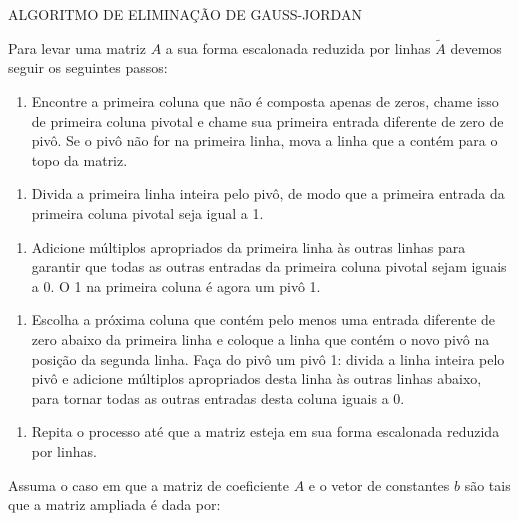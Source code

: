 \documentclass[
  brazilian,
  letterpaper,
  DIV=11,
  numbers=noendperiod]{scrreprt}
\providecommand{\tightlist}{%
  \setlength{\itemsep}{0pt}\setlength{\parskip}{0pt}}
\begin{document}
ALGORITMO DE ELIMINAÇÃO DE GAUSS-JORDAN

Para levar uma matriz \(A\) a sua forma escalonada reduzida por linhas
\(\tilde{A}\) devemos seguir os seguintes passos:

\begin{enumerate}
\def\labelenumi{\arabic{enumi}.}
\tightlist
\item
  Encontre a primeira coluna que não é composta apenas de zeros, chame
  isso de primeira coluna pivotal e chame sua primeira entrada diferente
  de zero de pivô. Se o pivô não for na primeira linha, mova a linha que
  a contém para o topo da matriz.
\end{enumerate}

\begin{enumerate}
\def\labelenumi{\arabic{enumi}.}
\setcounter{enumi}{1}
\tightlist
\item
  Divida a primeira linha inteira pelo pivô, de modo que a primeira
  entrada da primeira coluna pivotal seja igual a 1.
\end{enumerate}

\begin{enumerate}
\def\labelenumi{\arabic{enumi}.}
\setcounter{enumi}{2}
\tightlist
\item
  Adicione múltiplos apropriados da primeira linha às outras linhas para
  garantir que todas as outras entradas da primeira coluna pivotal sejam
  iguais a 0. O 1 na primeira coluna é agora um pivô 1.
\end{enumerate}

\begin{enumerate}
\def\labelenumi{\arabic{enumi}.}
\setcounter{enumi}{3}
\tightlist
\item
  Escolha a próxima coluna que contém pelo menos uma entrada diferente
  de zero abaixo da primeira linha e coloque a linha que contém o novo
  pivô na posição da segunda linha. Faça do pivô um pivô 1: divida a
  linha inteira pelo pivô e adicione múltiplos apropriados desta linha
  às outras linhas abaixo, para tornar todas as outras entradas desta
  coluna iguais a 0.
\end{enumerate}

\begin{enumerate}
\def\labelenumi{\arabic{enumi}.}
\setcounter{enumi}{4}
\tightlist
\item
  Repita o processo até que a matriz esteja em sua forma escalonada
  reduzida por linhas.
\end{enumerate}

Assuma o caso em que a matriz de coeficiente \(A\) e o vetor de
constantes \(b\) são tais que a matriz ampliada é dada por:
\end{document}
